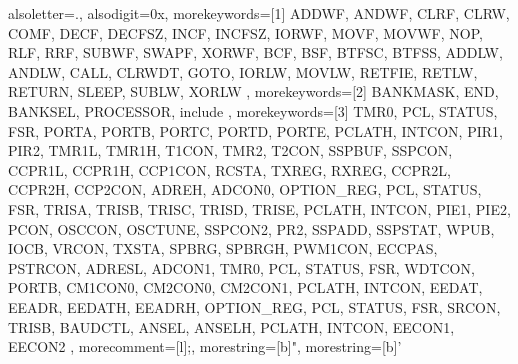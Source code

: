%
% 
%
%

{
	alsoletter={.}, %
	alsodigit={0x}, %
	morekeywords=[1]{ %
		ADDWF, ANDWF, CLRF, CLRW, COMF, DECF, DECFSZ, INCF, INCFSZ, IORWF, MOVF, MOVWF, NOP, RLF, RRF, SUBWF, SWAPF, XORWF,
		BCF, BSF, BTFSC, BTFSS,
		ADDLW, ANDLW, CALL, CLRWDT, GOTO, IORLW, MOVLW, RETFIE, RETLW, RETURN, SLEEP, SUBLW, XORLW
	},
	morekeywords=[2]{ %
		BANKMASK, END, BANKSEL, PROCESSOR, include
	},
	morekeywords=[3]{ %
		TMR0, PCL, STATUS, FSR, PORTA, PORTB, PORTC, PORTD, PORTE, PCLATH, INTCON, PIR1, PIR2, TMR1L, TMR1H, T1CON, TMR2, T2CON, SSPBUF, SSPCON, CCPR1L, CCPR1H, CCP1CON, RCSTA, TXREG, RXREG, CCPR2L, CCPR2H, CCP2CON, ADREH, ADCON0,
		OPTION_REG, PCL, STATUS, FSR, TRISA, TRISB, TRISC, TRISD, TRISE, PCLATH, INTCON, PIE1, PIE2, PCON, OSCCON, OSCTUNE, SSPCON2, PR2, SSPADD, SSPSTAT, WPUB, IOCB, VRCON, TXSTA, SPBRG, SPBRGH, PWM1CON, ECCPAS, PSTRCON, ADRESL, ADCON1,
		TMR0, PCL, STATUS, FSR, WDTCON, PORTB, CM1CON0, CM2CON0, CM2CON1, PCLATH, INTCON, EEDAT, EEADR, EEDATH, EEADRH,
		OPTION_REG, PCL, STATUS, FSR, SRCON, TRISB, BAUDCTL, ANSEL, ANSELH, PCLATH, INTCON, EECON1, EECON2
	},
	morecomment=[l]{;},   %
	morestring=[b]",      %
	morestring=[b]'       %
}



